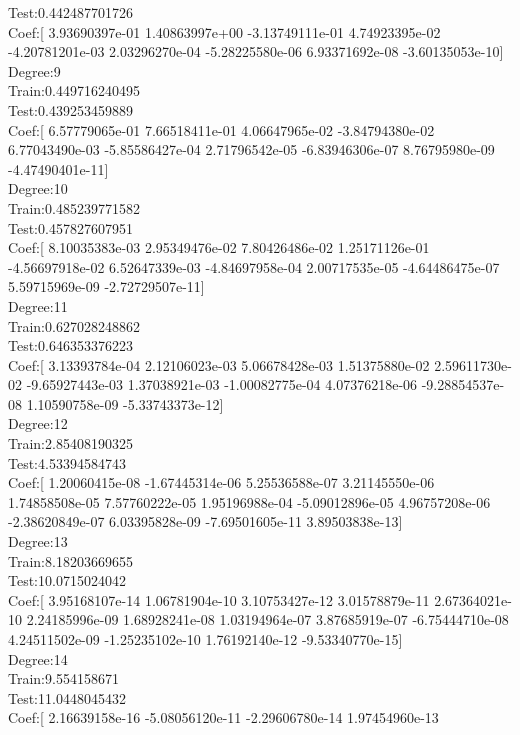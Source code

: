 \documentclass [11pt, a4paper, oneside] {article}
\begin{document}
Test:0.442487701726\\
Coef:[  3.93690397e-01   1.40863997e+00  -3.13749111e-01   4.74923395e-02
  -4.20781201e-03   2.03296270e-04  -5.28225580e-06   6.93371692e-08
  -3.60135053e-10]\\
Degree:9\\
Train:0.449716240495\\
Test:0.439253459889\\
Coef:[  6.57779065e-01   7.66518411e-01   4.06647965e-02  -3.84794380e-02
   6.77043490e-03  -5.85586427e-04   2.71796542e-05  -6.83946306e-07
   8.76795980e-09  -4.47490401e-11]\\
Degree:10\\
Train:0.485239771582\\
Test:0.457827607951\\
Coef:[  8.10035383e-03   2.95349476e-02   7.80426486e-02   1.25171126e-01
  -4.56697918e-02   6.52647339e-03  -4.84697958e-04   2.00717535e-05
  -4.64486475e-07   5.59715969e-09  -2.72729507e-11]\\
Degree:11\\
Train:0.627028248862\\
Test:0.646353376223\\
Coef:[  3.13393784e-04   2.12106023e-03   5.06678428e-03   1.51375880e-02
   2.59611730e-02  -9.65927443e-03   1.37038921e-03  -1.00082775e-04
   4.07376218e-06  -9.28854537e-08   1.10590758e-09  -5.33743373e-12]\\
Degree:12\\
Train:2.85408190325\\
Test:4.53394584743\\
Coef:[  1.20060415e-08  -1.67445314e-06   5.25536588e-07   3.21145550e-06
   1.74858508e-05   7.57760222e-05   1.95196988e-04  -5.09012896e-05
   4.96757208e-06  -2.38620849e-07   6.03395828e-09  -7.69501605e-11
   3.89503838e-13]\\
Degree:13\\
Train:8.18203669655\\
Test:10.0715024042\\
Coef:[  3.95168107e-14   1.06781904e-10   3.10753427e-12   3.01578879e-11
   2.67364021e-10   2.24185996e-09   1.68928241e-08   1.03194964e-07
   3.87685919e-07  -6.75444710e-08   4.24511502e-09  -1.25235102e-10
   1.76192140e-12  -9.53340770e-15]\\
Degree:14\\
Train:9.554158671\\
Test:11.0448045432\\
Coef:[  2.16639158e-16  -5.08056120e-11  -2.29606780e-14   1.97454960e-13
\end{document}
